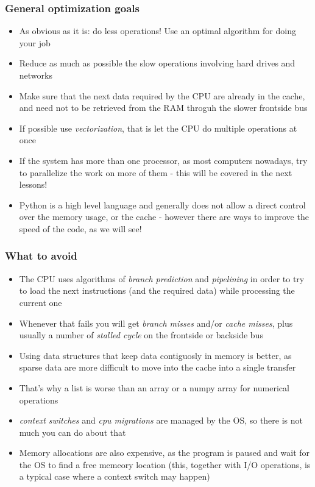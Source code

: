 \documentclass[9pt]{beamer}
\begin{document}
\begin{frame}
  \frametitle{General optimization goals}
  \begin{itemize}
    \item As obvious as it is: do less operations! Use an optimal algorithm for doing your job
    \item Reduce as much as possible the slow operations involving hard drives and
          networks
    \item Make sure that the next data required by the CPU are already in the
          cache, and need not to be retrieved from the RAM throguh the slower
          frontside bus
    \item If possible use \emph{vectorization}, that is let the CPU do
          multiple operations at once
    \item If the system has more than one processor, as most computers nowadays,
          try to parallelize the work on more of them - this will be covered in
          the next lessons!
    \item Python is a high level language and generally does not allow a
          direct control over the memory usage, or the cache - however there 
          are ways to improve the speed of the code, as we will see!
  \end{itemize}
  
\end{frame}


\begin{frame}
  \frametitle{What to avoid}
  \begin{itemize}
    \item The CPU uses algorithms of \emph{branch prediction} and \emph{pipelining}
          in order to try to load the next instructions (and the required data) while processing the current one
    \item Whenever that fails you will get \emph{branch misses} and/or \emph{cache misses},
          plus usually a number of \emph{stalled cycle} on the frontside or backside bus
    \item Using data structures that keep data contiguosly in memory is better,
          as sparse data are more difficult to move into the cache into a single transfer
    \item That's why a list is worse than an array or a numpy array for numerical operations
    \item \emph{context switches} and \emph{cpu migrations} are managed by the OS, so
          there is not much you can do about that
    \item Memory allocations are also expensive, as the program is paused and wait for the OS
          to find a free memeory location (this, together with I/O operations, is
          a typical case where a context switch may happen)
  \end{itemize}
  
\end{frame}
\end{document}
